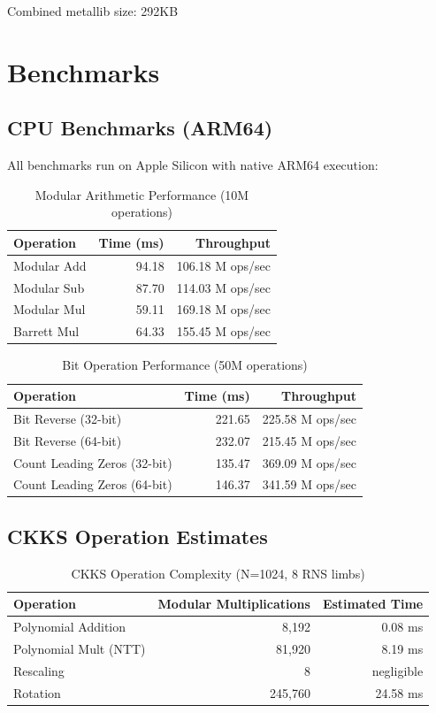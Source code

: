 \documentclass[11pt,oneside]{article}
\begin{document}
Combined metallib size: 292KB

\section{Benchmarks}

\subsection{CPU Benchmarks (ARM64)}

All benchmarks run on Apple Silicon with native ARM64 execution:

\begin{table}[h]
\centering
\caption{Modular Arithmetic Performance (10M operations)}
\begin{tabular}{lrr}
\toprule
Operation & Time (ms) & Throughput \\
\midrule
Modular Add & 94.18 & 106.18 M ops/sec \\
Modular Sub & 87.70 & 114.03 M ops/sec \\
Modular Mul & 59.11 & 169.18 M ops/sec \\
Barrett Mul & 64.33 & 155.45 M ops/sec \\
\bottomrule
\end{tabular}
\end{table}

\begin{table}[h]
\centering
\caption{Bit Operation Performance (50M operations)}
\begin{tabular}{lrr}
\toprule
Operation & Time (ms) & Throughput \\
\midrule
Bit Reverse (32-bit) & 221.65 & 225.58 M ops/sec \\
Bit Reverse (64-bit) & 232.07 & 215.45 M ops/sec \\
Count Leading Zeros (32-bit) & 135.47 & 369.09 M ops/sec \\
Count Leading Zeros (64-bit) & 146.37 & 341.59 M ops/sec \\
\bottomrule
\end{tabular}
\end{table}

\subsection{CKKS Operation Estimates}

\begin{table}[h]
\centering
\caption{CKKS Operation Complexity (N=1024, 8 RNS limbs)}
\begin{tabular}{lrr}
\toprule
Operation & Modular Multiplications & Estimated Time \\
\midrule
Polynomial Addition & 8,192 & 0.08 ms \\
Polynomial Mult (NTT) & 81,920 & 8.19 ms \\
Rescaling & 8 & negligible \\
Rotation & 245,760 & 24.58 ms \\
\bottomrule
\end{tabular}
\end{table}
\end{document}
